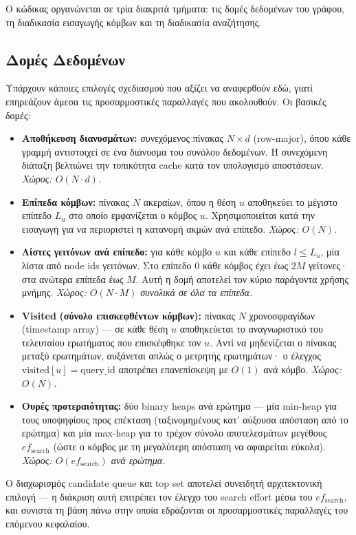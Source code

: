 \documentclass[12pt,a4paper]{article}
\begin{document}
Ο κώδικας οργανώνεται σε τρία διακριτά τμήματα: τις δομές δεδομένων του γράφου, τη διαδικασία εισαγωγής κόμβων και τη διαδικασία αναζήτησης.


\subsection{Δομές Δεδομένων}
Υπάρχουν κάποιες επιλογές σχεδιασμού που αξίζει να αναφερθούν εδώ, γιατί επηρεάζουν άμεσα τις προσαρμοστικές παραλλαγές που ακολουθούν. Οι βασικές δομές:
\begin{itemize}
    \item \textbf{Αποθήκευση διανυσμάτων:} συνεχόμενος πίνακας $N \times d$ (row-major), όπου κάθε γραμμή αντιστοιχεί σε ένα διάνυσμα του συνόλου δεδομένων. Η συνεχόμενη διάταξη βελτιώνει την τοπικότητα cache κατά τον υπολογισμό αποστάσεων. \textit{Χώρος: $O(N \cdot d)$.}
    \item \textbf{Επίπεδα κόμβων:} πίνακας $N$ ακεραίων, όπου η θέση $u$ αποθηκεύει το μέγιστο επίπεδο $L_u$ στο οποίο εμφανίζεται ο κόμβος $u$. Χρησιμοποιείται κατά την εισαγωγή για να περιοριστεί η κατανομή ακμών ανά επίπεδο. \textit{Χώρος: $O(N)$.}
    \item \textbf{Λίστες γειτόνων ανά επίπεδο:} για κάθε κόμβο $u$ και κάθε επίπεδο $l \le L_u$, μία λίστα από node ids γειτόνων. Στο επίπεδο 0 κάθε κόμβος έχει έως $2M$ γείτονες· στα ανώτερα επίπεδα έως $M$. Αυτή η δομή αποτελεί τον κύριο παράγοντα χρήσης μνήμης. \textit{Χώρος: $O(N \cdot M)$ συνολικά σε όλα τα επίπεδα.}
    \item {}\textbf{Visited} \textbf{(σύνολο επισκεφθέντων κόμβων):} πίνακας $N$ χρονοσφραγίδων (timestamp array) --- σε κάθε θέση $u$ αποθηκεύεται το αναγνωριστικό του τελευταίου ερωτήματος που επισκέφθηκε τον $u$. Αντί να μηδενίζεται ο πίνακας μεταξύ ερωτημάτων, αυξάνεται απλώς ο μετρητής ερωτημάτων· ο έλεγχος $\text{visited}[u] = \text{query\_id}$ αποτρέπει επανεπίσκεψη με $O(1)$ ανά κόμβο. \textit{Χώρος: $O(N)$.}
    \item \textbf{Ουρές προτεραιότητας:} δύο binary heaps ανά ερώτημα --- μία min-heap για τους υποψηφίους προς επέκταση (ταξινομημένους κατ' αύξουσα απόσταση από το ερώτημα) και μία max-heap για το τρέχον σύνολο αποτελεσμάτων μεγέθους $ef_{\text{search}}$ (ώστε ο κόμβος με τη μεγαλύτερη απόσταση να αφαιρείται εύκολα). \textit{Χώρος: $O(ef_{\text{search}})$ ανά ερώτημα.}
\end{itemize}
Ο διαχωρισμός candidate queue και top set αποτελεί συνειδητή αρχιτεκτονική επιλογή --- η διάκριση αυτή επιτρέπει τον έλεγχο του search effort μέσω του $ef_{\text{search}}$, και συνιστά τη βάση πάνω στην οποία εδράζονται οι προσαρμοστικές παραλλαγές του επόμενου κεφαλαίου.
\end{document}
